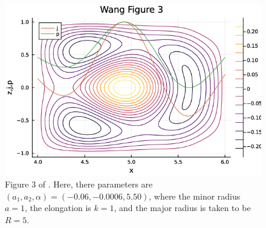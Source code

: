 \begin{figure}[h!]
    \centering
    \includegraphics[scale=0.6]{imgs/c3/wang-fig-3.png}
    \caption{Figure 3 of \cite{wang-analytic-solution}. Here, there parameters are $(a_1, a_2, \alpha) = (-0.06, -0.0006, 5.50)$, 
    where the minor radius $a = 1$, the elongation is $k = 1$, and the major radius is taken to be $R = 5$.}
\end{figure}
